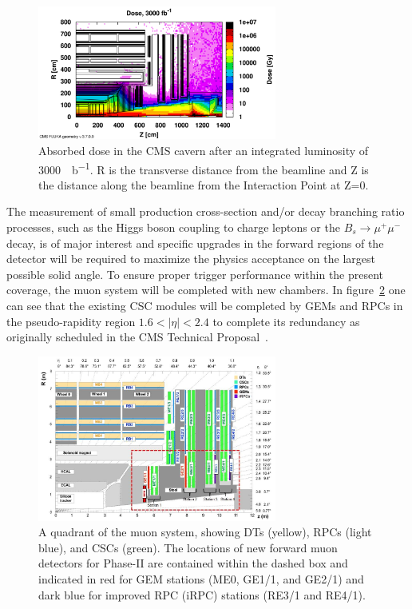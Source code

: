 \begin{figure}[ht!]
	\centering
	\includegraphics[width=0.7\textwidth]{fig/HL-LHC-Dose.png}
	\caption{\label{fig:Dose} Absorbed dose in the \acs{CMS} cavern after an integrated luminosity of \SI{3000}{\femto\per\barn}. R is the transverse distance from the beamline and Z is the distance along the beamline from the Interaction Point at Z=0.}
\end{figure}

The measurement of small production cross-section and/or decay branching ratio processes, such as the Higgs boson coupling to charge leptons or the $B_s \longrightarrow \mu^+\mu^-$ decay, is of major interest and specific upgrades in the forward regions of the detector will be required to maximize the physics acceptance on the largest possible solid angle. To ensure proper trigger performance within the present coverage, the muon system will be completed with new chambers. In figure~\ref{fig:Quadrant} one can see that the existing \acf{CSC} modules will be completed by \acfp{GEM} and \acfp{RPC} in the pseudo-rapidity region $1.6<\vert\eta\vert<2.4$ to complete its redundancy as originally scheduled in the \acs{CMS} Technical Proposal~\cite{CMSTP}.

\begin{figure}[ht!]
	\centering
	\includegraphics[width=0.7\textwidth]{fig/MuonUpgrade-Plans.jpg}
	\caption{\label{fig:Quadrant} A quadrant of the muon system, showing \acsp{DT} (yellow), \acsp{RPC} (light blue), and \acsp{CSC} (green). The locations of new forward muon detectors for Phase-II are contained within the dashed box and indicated in red for \acs{GEM} stations (\acs{ME0}, \acs{GE1/1}, and \acs{GE2/1}) and dark blue for improved RPC (\acs{iRPC}) stations (RE3/1 and RE4/1).}
\end{figure}

